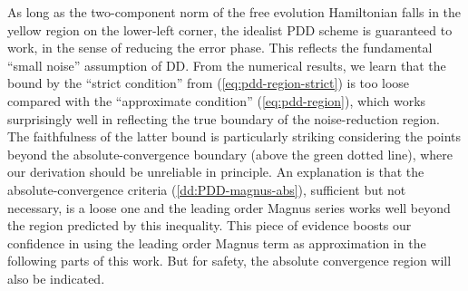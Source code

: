 \documentclass[pra,reprint,superscriptaddress]{revtex4-2}
\begin{document}
{As long as the two-component norm of the free evolution Hamiltonian falls in the yellow region on the lower-left corner, the idealist PDD scheme is guaranteed to work, in the sense of reducing the error phase. This reflects the fundamental ``small noise'' assumption of DD. From the numerical results, we learn that the bound by the ``strict condition'' from (\ref{eq:pdd-region-strict}) is too loose compared with the ``approximate condition'' (\ref{eq:pdd-region}), which works surprisingly well in reflecting the true boundary of the noise-reduction region. The faithfulness of the latter bound is particularly striking considering the points beyond the absolute-convergence boundary (above the green dotted line), where our derivation should be unreliable in principle. An explanation is that the absolute-convergence criteria (\ref{dd:PDD-magnus-abs}), sufficient but not necessary, is a loose one and the leading order Magnus series works well beyond the region predicted by this inequality. This piece of evidence boosts our confidence in using the leading order Magnus term as approximation in the following parts of this work. But for safety, the absolute convergence region will also be indicated. 
}



\end{document}
